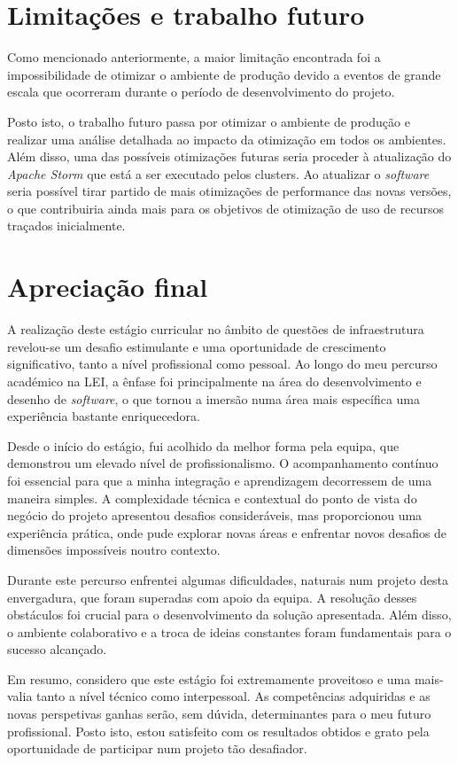\section{Limitações e trabalho futuro}

Como mencionado anteriormente, a maior limitação encontrada foi a impossibilidade de otimizar o
ambiente de produção devido a eventos de grande escala que ocorreram durante o período de
desenvolvimento do projeto. 

Posto isto, o trabalho futuro passa por otimizar o ambiente de produção e realizar uma análise 
detalhada ao impacto da otimização em todos os ambientes. Além disso, uma das possíveis otimizações 
futuras seria proceder à atualização do \textit{Apache Storm} que está a ser executado pelos 
\glspl{cluster}. Ao atualizar o \textit{software} seria possível tirar partido de mais otimizações 
de performance das novas versões, o que contribuiria ainda mais para os objetivos de otimização
de uso de recursos traçados inicialmente.

\section{Apreciação final}

A realização deste estágio curricular no âmbito de questões de infraestrutura revelou-se um desafio 
estimulante e uma oportunidade de crescimento significativo, tanto a nível profissional como 
pessoal. Ao longo do meu percurso académico na \ac{LEI}, a ênfase foi principalmente na área do 
desenvolvimento e desenho de \textit{software}, o que tornou a imersão numa área mais específica 
uma experiência bastante enriquecedora.

Desde o início do estágio, fui acolhido da melhor forma pela equipa, que demonstrou um elevado 
nível de profissionalismo. O acompanhamento contínuo foi essencial para que a minha integração e 
aprendizagem decorressem de uma maneira simples. A complexidade técnica e contextual do ponto de 
vista do negócio do projeto apresentou desafios consideráveis, mas proporcionou uma experiência 
prática, onde pude explorar novas áreas e enfrentar novos desafios de dimensões impossíveis noutro 
contexto.

Durante este percurso enfrentei algumas dificuldades, naturais num projeto desta envergadura, que 
foram superadas com apoio da equipa. A resolução desses obstáculos foi crucial para o desenvolvimento
da solução apresentada. Além disso, o ambiente colaborativo e a troca de ideias constantes foram 
fundamentais para o sucesso alcançado.

Em resumo, considero que este estágio foi extremamente proveitoso e uma mais-valia tanto a nível
técnico como interpessoal. As competências adquiridas e as novas perspetivas ganhas serão, sem 
dúvida, determinantes para o meu futuro profissional. Posto isto, estou satisfeito com os resultados 
obtidos e grato pela oportunidade de participar num projeto tão desafiador.

